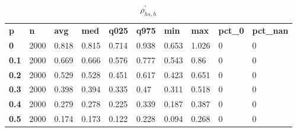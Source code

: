 \begin{table}[h]
 \centering 
\footnotesize
\caption{$\rho_{hs,h}^\prime $}
\label{tab:alphahsh}
\begin{tabular}[h]{| l l l l l l l l l l|
    } \hline
\textbf{ p} & \textbf{ n} & \textbf{ avg} & \textbf{ med} & \textbf{ q025} & \textbf{ q975} & \textbf{ min} & \textbf{ max} & \textbf{ pct\_0} & \textbf{ pct\_nan}
           \\
  \textbf{  0} & 2000 & 0.818 & 0.815 & 0.714 & 0.938 & 0.653 & 1.026 & 0 & 0
           \\
  \textbf{0.1} & 2000 & 0.669 & 0.666 & 0.576 & 0.777 & 0.543 &  0.86 & 0 & 0
           \\
  \textbf{0.2} & 2000 & 0.529 & 0.528 & 0.451 & 0.617 & 0.423 & 0.651 & 0 & 0
           \\
  \textbf{0.3} & 2000 & 0.398 & 0.394 & 0.335 &  0.47 & 0.311 & 0.518 & 0 & 0
           \\
  \textbf{0.4} & 2000 & 0.279 & 0.278 & 0.225 & 0.339 & 0.187 & 0.387 & 0 & 0
           \\
  \textbf{0.5} & 2000 & 0.174 & 0.173 & 0.122 & 0.228 & 0.094 & 0.268 & 0 & 0
           \\
 \hline \end{tabular}
 \end{table}
